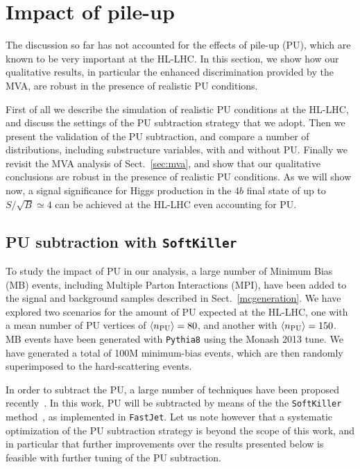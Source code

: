 
\section{Impact of pile-up}

\label{sec:pileup}

The discussion so far has not accounted for the effects of
pile-up (PU), which are known to be very important at the HL-LHC.
%
In this section, we show how our qualitative results, in particular
the enhanced discrimination provided by the MVA, are robust
in the presence of realistic PU conditions.


First of all we describe the simulation of realistic
PU conditions at the HL-LHC, and discuss the settings of
the PU subtraction strategy that we adopt.
%
Then we present the validation of the PU subtraction,
and compare a number of distributions, including substructure variables,
with and without PU.
%
Finally we revisit the MVA analysis of Sect.~\ref{sec:mva}, and
show that our qualitative conclusions are robust
in the presence of realistic PU conditions.
%
As we will show now, a signal significance for
Higgs production in the $4b$ final state
of up to $S/\sqrt{B}\simeq 4$
can be achieved at the HL-LHC even accounting for PU.


\subsection{PU subtraction with {\tt SoftKiller}}

To study the impact of PU in our analysis,
a large number
of Minimum Bias (MB) events,
including Multiple Parton Interactions (MPI),
have been added to the signal
and background samples described in Sect.~\ref{mcgeneration}.
%
We have explored two scenarios for the amount of PU expected
at the HL-LHC, one with a mean number of
PU vertices of $\left\langle n_{\rm PU}\right\rangle=80$, and another
with $\left\langle n_{\rm PU}\right\rangle=150$.
%
MB events have been generated with {\tt Pythia8} using
the Monash 2013 tune.
%
We have generated a total of 100M minimum-bias events, which are
then randomly superimposed to the hard-scattering events.

In order to subtract the PU, a large number of techniques
have been proposed recently~\cite{Cacciari:2009dp,TheATLAScollaboration:2013pia,Butterworth:2008iy,Cacciari:2007fd,Krohn:2009th,Krohn:2013lba,Ellis:2009me,Bertolini:2014bba,Cacciari:2014gra,Cacciari:2014jta,Berta:2014eza,Larkoski:2014wba}.
%
In this work, PU  will be subtracted by means
of the the {\tt SoftKiller}
method~\cite{Cacciari:2014gra}, as implemented in {\tt FastJet}.
%
Let us note however that
a systematic optimization of the PU subtraction strategy is beyond
the scope of this work, and in particular that further
improvements over the results presented below is feasible
with further tuning of the PU subtraction.


